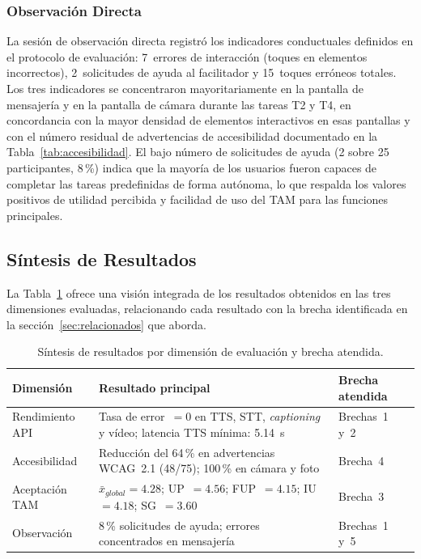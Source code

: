 \documentclass[journal]{IEEEtran}
\begin{document}
			\subsubsection{Observaci\'on Directa}
				La sesi\'on de observaci\'on directa registr\'o los indicadores conductuales definidos en el protocolo de evaluaci\'on: 7~errores de interacci\'on (toques en elementos incorrectos), 2~solicitudes de ayuda al facilitador y 15~toques err\'oneos totales. Los tres indicadores se concentraron mayoritariamente en la pantalla de mensajer\'ia y en la pantalla de c\'amara durante las tareas T2 y T4, en concordancia con la mayor densidad de elementos interactivos en esas pantallas y con el n\'umero residual de advertencias de accesibilidad documentado en la Tabla~\ref{tab:accesibilidad}. El bajo n\'umero de solicitudes de ayuda (2 sobre 25 participantes, 8\,\%) indica que la mayor\'ia de los usuarios fueron capaces de completar las tareas predefinidas de forma aut\'onoma, lo que respalda los valores positivos de utilidad percibida y facilidad de uso del TAM para las funciones principales.
				
		\subsection{S\'intesis de Resultados}
			La Tabla~\ref{tab:sintesis} ofrece una visi\'on integrada de los resultados obtenidos en las tres dimensiones evaluadas, relacionando cada resultado con la brecha identificada en la secci\'on~\ref{sec:relacionados} que aborda.
			
			\begin{table}[!t]
				\caption{S\'intesis de resultados por dimensi\'on de evaluaci\'on y brecha atendida.}
				\label{tab:sintesis}
				\centering
				\small
				\renewcommand{\arraystretch}{1.25}
				\begin{tabular}{p{2.0cm}p{2.8cm}p{2.5cm}}
					\toprule
					\textbf{Dimensi\'on} & \textbf{Resultado principal} & \textbf{Brecha atendida} \\
					\midrule
					Rendimiento API   & Tasa de error~$=0$ en TTS, STT, \textit{captioning} y v\'ideo; latencia TTS m\'inima: 5.14~s & Brechas~1 y~2 \\
					Accesibilidad    & Reducci\'on del 64\,\% en advertencias WCAG~2.1 (48/75); 100\,\% en c\'amara y foto & Brecha~4 \\
					Aceptaci\'on TAM & $\bar{x}_{global}=4.28$; UP~$=4.56$; FUP~$=4.15$; IU~$=4.18$; SG~$=3.60$ & Brecha~3 \\
					Observaci\'on    & 8\,\% solicitudes de ayuda; errores concentrados en mensajer\'ia & Brechas~1 y~5 \\
					\bottomrule
				\end{tabular}
			\end{table}
			
\end{document}
